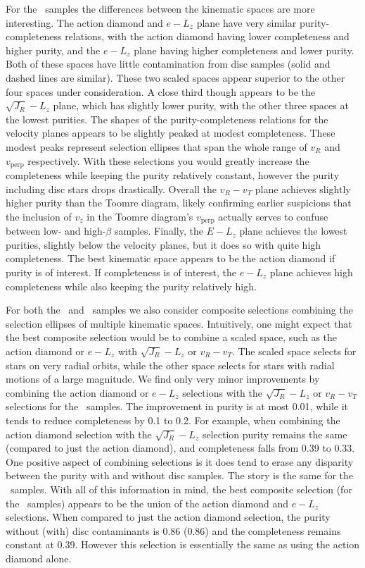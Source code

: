 For the \survey\ samples the differences between the kinematic spaces are more interesting. The action diamond and $e-L_{z}$ plane have very similar purity-completeness relations, with the action diamond having lower completeness and higher purity, and the $e-L_{z}$ plane having higher completeness and lower purity. Both of these spaces have little contamination from disc samples (solid and dashed lines are similar). These two scaled spaces appear superior to the other four spaces under consideration. A close third though appears to be the $\sqrt{J_{R}}-L_{z}$ plane, which has slightly lower purity, with the other three spaces at the lowest purities. The shapes of the purity-completeness relations for the velocity planes appears to be slightly peaked at modest completeness. These modest peaks represent selection ellipses that span the whole range of $v_{R}$ and $v_\mathrm{perp}$ respectively. With these selections you would greatly increase the completeness while keeping the purity relatively constant, however the purity including disc stars drops drastically. Overall the $v_{R}-v_{T}$ plane achieves slightly higher purity than the Toomre diagram, likely confirming earlier suspicions that the inclusion of $v_{z}$ in the Toomre diagram's $v_\mathrm{perp}$ actually serves to confuse between low- and high-$\beta$ samples. Finally, the $E-L_{z}$ plane achieves the lowest purities, slightly below the velocity planes, but it does so with quite high completeness. The best kinematic space appears to be the action diamond if purity is of interest. If completeness is of interest, the $e-L_{z}$ plane achieves high completeness while also keeping the purity relatively high.

For both the \solar\ and \survey\ samples we also consider composite selections combining the selection ellipses of multiple kinematic spaces. Intuitively, one might expect that the best composite selection would be to combine a scaled space, such as the action diamond or $e-L_{z}$ with $\sqrt{J_{R}}-L_{z}$ or $v_{R}-v_{T}$. The scaled space selects for stars on very radial orbits, while the other space selects for stars with radial motions of a large magnitude. We find only very minor improvements by combining the action diamond or $e-L_{z}$ selections with the $\sqrt{J_{R}}-L_{z}$ or $v_{R}-v_{T}$ selections for the \survey\ samples. The improvement in purity is at most 0.01, while it tends to reduce completeness by 0.1 to 0.2. For example, when combining the action diamond selection with the $\sqrt{J_{R}}-L_{z}$ selection purity remains the same (compared to just the action diamond), and completeness falls from 0.39 to 0.33. One positive aspect of combining selections is it does tend to erase any disparity between the purity with and without disc samples. The story is the same for the \solar\ samples. With all of this information in mind, the best composite selection (for the \survey\ samples) appears to be the union of the action diamond and $e-L_{z}$ selections. When compared to just the action diamond selection, the purity without (with) disc contaminants is 0.86 (0.86) and the completeness remains constant at 0.39. However this selection is essentially the same as using the action diamond alone.

